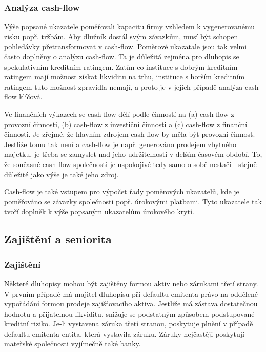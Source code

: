 \documentclass[a4paper]{book}
\begin{document}
\subsubsection{Analýza cash-flow}

Výše popsané ukazatele poměřovali kapacitu firmy vzhledem k vygenerovanému zisku popř. tržbám. Aby dlužník dostál svým závazkům, musí být schopen pohledávky přetransformovat v cash-flow. Poměrové ukazatale jsou tak velmi často doplněny o analýzu cash-flow. Ta je důležitá zejména pro dluhopis se spekulativním kreditním ratingem. Zatím co instituce s dobrým kreditním ratingem mají možnost získat likviditu na trhu, instituce s horším kreditním ratingem tuto možnost zpravidla nemají, a proto je v jejich případě analýza cash-flow klíčová.

Ve finančních výkazech se cash-flow dělí podle činností na (a) cash-flow z provozní činnosti, (b) cash-flow z investiční činnosti a (c) cash-flow z finanční činnosti. Je zřejmé, že hlavním zdrojem cash-flow by měla být provozní činnost. Jestliže tomu tak není a cash-flow je např. generováno prodejem zbytného majetku, je třeba se zamyslet nad jeho udržitelností v delším časovém období. To, že současné cash-flow společnosti je uspokojivé tedy samo o sobě nestačí - stejně důležité jako výše je také jeho zdroj.

Cash-flow je také vstupem pro výpočet řady poměrových ukazatelů, kde je poměřováno se závazky společnosti popř. úrokovými platbami. Tyto ukazatele tak tvoří doplněk k výše popsaným ukazatelům úrokového krytí.

\subsection{Zajištění a seniorita}

\subsubsection{Zajištění}

Některé dluhopisy mohou být zajištěny formou aktiv nebo zárukami třetí strany. V prvním případě má majitel dluhopisu při defaultu emitenta právo na oddělené vypořádání formou prodeje zajišťovacího aktiva. Jestliže má zástava dostatečnou hodnotu a přijatelnou likviditu, snižuje se podstatným způsobem podstupované kreditní riziko. Je-li vystavena záruka třetí stranou, poskytuje plnění v případě defaultu emitenta entita, která vystavila záruku. Záruky nejčastěji poskytují mateřské společnosti vyjímečně také banky.
\end{document}
